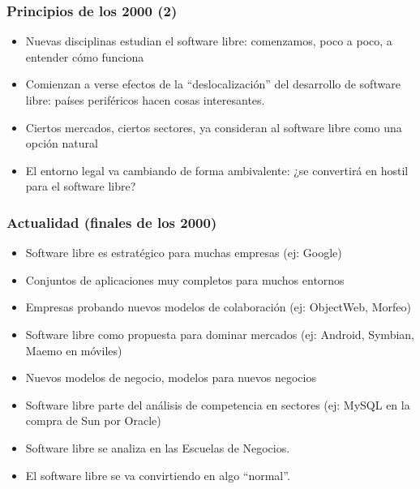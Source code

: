 \documentclass{beamer}
\begin{document}
\begin{frame}
\frametitle{Principios de los 2000 (2)}

\begin{itemize}
\item Nuevas disciplinas estudian el software libre: comenzamos, poco a poco, a entender cómo funciona
\item Comienzan a verse efectos de la ``deslocalización'' del desarrollo de software libre: países periféricos hacen cosas
interesantes.
\item Ciertos mercados, ciertos sectores, ya consideran al software libre como una opción natural
\item El entorno legal va cambiando de forma ambivalente: ¿se convertirá en hostil para el software libre?
\end{itemize}

\end{frame}


\begin{frame}
\frametitle{Actualidad (finales de los 2000)}

\begin{itemize}
\item Software libre es estratégico para muchas empresas (ej: Google)
\item Conjuntos de aplicaciones muy completos para muchos entornos
\item Empresas probando nuevos modelos de colaboración (ej: ObjectWeb, Morfeo)
\item Software libre como propuesta para dominar mercados (ej: Android, Symbian, Maemo en móviles)
\item Nuevos modelos de negocio, modelos para nuevos negocios
\item Software libre parte del análisis de competencia en sectores (ej: MySQL en la compra de Sun por Oracle)
\item Software libre se analiza en las Escuelas de Negocios.
\item El software libre se va convirtiendo en algo ``normal''.
\end{itemize}

\end{frame}

\end{document}
